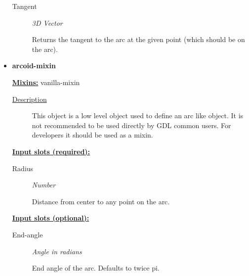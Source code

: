 \documentclass [11pt]{book}
\begin{document}
\begin{itemize}
\begin{description}
\item [Tangent]
\emph{3D Vector}

 Returns the tangent to the arc at the given point (which should be on the arc).




\end{description}







\item {}
\label{prim:arcoid-mixin}
\textbf{arcoid-mixin}


\textbf{
\underline{Mixins:}} vanilla-mixin





\begin{description}

\item [
\underline{Description}]


This object is a low level object used to define 
an arc like object. It is not recommended to be used directly by GDL common users. 
For developers it should be used as a mixin.



\end{description}








\textbf{
\underline{Input slots (required):}}

\begin{description}

\item [Radius]
\emph{Number}

 Distance from center to any point on the arc.




\end{description}






\textbf{
\underline{Input slots (optional):}}

\begin{description}

\item [End-angle]
\emph{Angle in radians}

 End angle of the arc. Defaults to twice pi.





\end{description}
\end{itemize}
\end{document}
